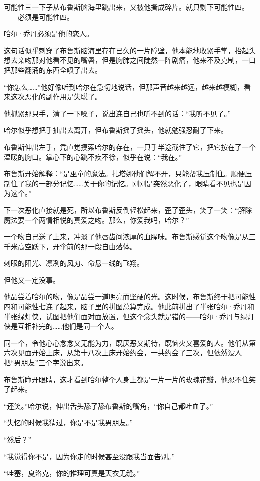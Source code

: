 \documentclass[../main.tex]{subfiles}
\begin{document}
可能性三一下子从布鲁斯脑海里跳出来，又被他撕成碎片。就只剩下可能性四。——必须是可能性四。

哈尔·乔丹必须是他的恋人。

这句话似乎刺穿了布鲁斯脑海里存在已久的一片障壁，他本能地收紧手掌，抬起头想去亲吻那对他看不见的嘴唇，但是胸肺之间陡然一阵剧痛，他来不及克制，一口把那些翻涌的东西全喷了出去。

“你怎么……”他好像听到哈尔在急切地说话，但那声音越来越远，越来越模糊，看来这次恶化的副作用是失聪了。

他抓紧那只手，清了一下嗓子，说出连自己也听不到的话：“我听不见了。”

哈尔似乎想把手抽出去离开，但布鲁斯摇了摇头，他就勉强忍耐了下来。

布鲁斯伸出左手，凭直觉摸索哈尔的存在，一只手半途截住了它，把它按在了一个温暖的胸口。掌心下的心跳不疾不徐，似乎在说：“我在。”

布鲁斯开始解释：“是巫童的魔法。扎塔娜他们解不开，只能帮我压制住。顺便压制住了我的一部分记忆……关于你的记忆。刚刚是突然恶化了，眼睛看不见也是因为这个。”

下一次恶化直接就是死，所以布鲁斯反倒轻松起来，歪了歪头，笑了一笑：“解除魔法要一个两情相悦的真爱之吻。那么，你爱我吗，哈尔？”

一个吻自己送了上来，冲淡了他唇齿间浓厚的血腥味。布鲁斯感觉这个吻像是从三千米高空跃下，开伞前的那一段自由落体。

刺眼的阳光、凛冽的风刃、命悬一线的飞翔。

但他又一定没事。

他品尝着哈尔的吻，像是品尝一道明亮而坚硬的光。这时候，布鲁斯终于把可能性四和可能性七连了起来，脑子里的拼图总算完成。他此前拼出了半张哈尔·乔丹和半张绿灯侠，试图把他们面对面放置，但这个念头就是错的——哈尔·乔丹与绿灯侠是互相补完的……他们是同一个人。

同一个，令他心心念念又无能为力，既厌恶又期待，既恼火又喜爱的人。他们从第六次见面开始上床，从第十八次上床开始约会，一共约会了三次，但依然没人把“男朋友”三个字说出来。

布鲁斯睁开眼睛，这才看到哈尔整个人身上都是一片一片的玫瑰花瓣，他忍不住笑了起来。

“还笑。”哈尔说，伸出舌头舔了舔布鲁斯的嘴角，“你自己都吐血了。”

“失忆的时候我猜过，你是不是我男朋友。”

“然后？”

“我觉得你不是，因为你走的时候甚至没跟我当面告别。”

“哇塞，夏洛克，你的推理可真是天衣无缝。”
\end{document}
